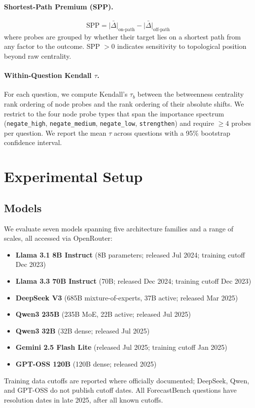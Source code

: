\documentclass[11pt]{article}
\begin{document}
\paragraph{Shortest-Path Premium (SPP).}
\begin{equation}
    \text{SPP} = \bar{|\Delta|}_{\text{on-path}} - \bar{|\Delta|}_{\text{off-path}}
\end{equation}
where probes are grouped by whether their target lies on a shortest path from any factor to the outcome. SPP $> 0$ indicates sensitivity to topological position beyond raw centrality.

\paragraph{Within-Question Kendall $\tau$.}
For each question, we compute Kendall's $\tau_b$ between the betweenness centrality rank ordering of node probes and the rank ordering of their absolute shifts. We restrict to the four node probe types that span the importance spectrum (\texttt{negate\_high}, \texttt{negate\_medium}, \texttt{negate\_low}, \texttt{strengthen}) and require $\geq 4$ probes per question. We report the mean $\tau$ across questions with a 95\% bootstrap confidence interval.

\section{Experimental Setup}
\label{sec:setup}

\subsection{Models}

We evaluate seven models spanning five architecture families and a range of scales, all accessed via OpenRouter:
\begin{itemize}
    \item \textbf{Llama 3.1 8B Instruct} (8B parameters; released Jul 2024; training cutoff Dec 2023)
    \item \textbf{Llama 3.3 70B Instruct} (70B; released Dec 2024; training cutoff Dec 2023)
    \item \textbf{DeepSeek V3} (685B mixture-of-experts, 37B active; released Mar 2025)
    \item \textbf{Qwen3 235B} (235B MoE, 22B active; released Jul 2025)
    \item \textbf{Qwen3 32B} (32B dense; released Jul 2025)
    \item \textbf{Gemini 2.5 Flash Lite} (released Jul 2025; training cutoff Jan 2025)
    \item \textbf{GPT-OSS 120B} (120B dense; released 2025)
\end{itemize}
Training data cutoffs are reported where officially documented; DeepSeek, Qwen, and GPT-OSS do not publish cutoff dates. All ForecastBench questions have resolution dates in late 2025, after all known cutoffs.
\end{document}
